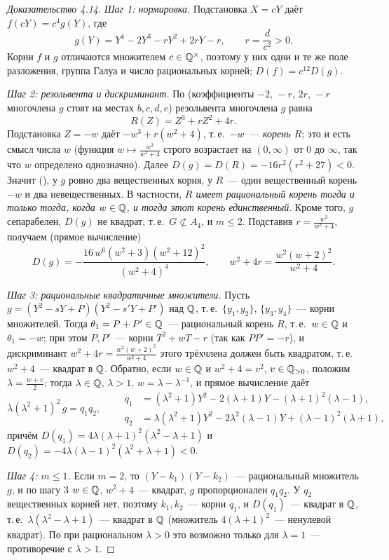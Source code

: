 \begin{proof}[Доказательство 4.14]
\emph{Шаг 1: нормировка.} Подстановка $X=cY$ даёт $f(cY)=c^4g(Y)$, где
\[
g(Y)=Y^4-2Y^3-rY^2+2rY-r,\qquad r=\frac d{c^2}>0 .
\]
Корни $f$ и $g$ отличаются множителем $c\in\mathbb Q^\times$, поэтому у них одни и те же поле разложения, группа Галуа и число
рациональных корней; $D(f)=c^{12}D(g)$.

\emph{Шаг 2: резольвента и дискриминант.} По  (коэффициенты $-2,\,-r,\,2r,\,-r$ многочлена $g$ стоят на местах $b,c,d,e$) резольвента многочлена $g$ равна
\[
R(Z)=Z^3+rZ^2+4r .
\]
Подстановка $Z=-w$ даёт $-w^3+r(w^2+4)$, т.\,е.\ \emph{$-w$~--- корень $R$}; это и есть смысл числа $w$ (функция $w\mapsto\frac{w^3}{w^2+4}$
строго возрастает на $(0,\infty)$ от $0$ до $\infty$, так что $w$ определено однозначно). Далее $D(g)=D(R)=-16r^2(r^2+27)<0$. Значит
(), у $g$ ровно два вещественных корня, у $R$~--- один вещественный корень $-w$ и два невещественных. В частности,
\emph{$R$ имеет рациональный корень тогда и только тогда, когда $w\in\mathbb Q$, и тогда этот корень единственный}. Кроме того, $g$
сепарабелен, $D(g)$ не квадрат, т.\,е.\ $G\not\subset A_4$, и $m\le2$. Подставив $r=\frac{w^3}{w^2+4}$, получаем (прямое вычисление)
\[
D(g)=-\frac{16\,w^6(w^2+3)(w^2+12)^2}{(w^2+4)^4},\qquad w^2+4r=\frac{w^2(w+2)^2}{w^2+4} .
\]

\emph{Шаг 3: рациональные квадратичные множители.} Пусть $g=(Y^2-sY+P)(Y^2-s'Y+P')$ над $\mathbb Q$, т.\,е.\ $\{y_1,y_2\}$, $\{y_3,y_4\}$~--- корни
множителей. Тогда $\theta_1=P+P'\in\mathbb Q$~--- рациональный корень $R$, т.\,е.\ $w\in\mathbb Q$ и $\theta_1=-w$; при этом $P,P'$~--- корни
$T^2+wT-r$ (так как $PP'=-r$), и дискриминант $w^2+4r=\frac{w^2(w+2)^2}{w^2+4}$ этого трёхчлена должен быть квадратом, т.\,е.\ $w^2+4$~---
квадрат в $\mathbb Q$. Обратно, если $w\in\mathbb Q$ и $w^2+4=v^2$, $v\in\mathbb Q_{>0}$, положим $\lambda=\frac{w+v}2$; тогда $\lambda\in\mathbb Q$, $\lambda>1$, $w=\lambda-\lambda^{-1}$,
и прямое вычисление даёт
\[
\lambda(\lambda^2+1)^2\,g=q_1q_2,\qquad
\begin{aligned}
q_1&=(\lambda^2+1)Y^2-2(\lambda+1)Y-(\lambda+1)^2(\lambda-1),\\
q_2&=\lambda(\lambda^2+1)Y^2-2\lambda^2(\lambda-1)Y+(\lambda-1)^2(\lambda+1),
\end{aligned}
\]
причём $D(q_1)=4\lambda(\lambda+1)^2(\lambda^2-\lambda+1)$ и $D(q_2)=-4\lambda(\lambda-1)^2(\lambda^2+\lambda+1)<0$.

\emph{Шаг 4: $m\le1$.} Если $m=2$, то $(Y-k_1)(Y-k_2)$~--- рациональный множитель $g$, и по шагу 3 $w\in\mathbb Q$, $w^2+4$~--- квадрат, $g$
пропорционален $q_1q_2$. У $q_2$ вещественных корней нет, поэтому $k_1,k_2$~--- корни $q_1$, и $D(q_1)$~--- квадрат в $\mathbb Q$, т.\,е.\
$\lambda(\lambda^2-\lambda+1)$~--- квадрат в $\mathbb Q$ (множитель $4(\lambda+1)^2$~--- ненулевой квадрат). По  при рациональном $\lambda>0$
это возможно только для $\lambda=1$~--- противоречие с $\lambda>1$.


\end{proof}
